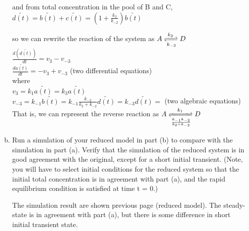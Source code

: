 \documentclass[paper=a4, fontsize=11pt]{scrartcl} %
\numberwithin{equation}{section} %
\numberwithin{figure}{section} %
\numberwithin{table}{section} %
\begin{document}
\begin{enumerate}[a)]
		and from total concentration in the pool of B and C,\\
		$\tilde{d(t)}=\tilde{b(t)}+\tilde{c(t)}=(1+\frac{k_2}{k_{-2}})\tilde{b(t)}$

		so we can rewrite the reaction of the system as $A \xrightleftharpoons[k_{-3}]{k_{3}} D$\\
		$\frac{d(\tilde{d(t)})}{dt}=v_{3}-v_{-3}$\\
		$\frac{d\tilde{a(t)}}{dt}=-v_{3}+v_{-3}$ (two differential equations)\\
		where\\
		$v_{3}=k_1\tilde{a(t)}=k_3\tilde{a(t)}$\\
		$v_{-3}=k_{-1}\tilde{b(t)}=k_{-1}\frac{k_{-2}}{k_2+k_{-2}}\tilde{d(t)}=k_{-3}\tilde{d(t)}=$
		(two algebraic equations)\\
		That is, we can represent the reverse reaction as $A \xrightleftharpoons[\frac{k_{-1}k_{-2}}{k_2+k_{-2}}]{k_{1}} D$

		\item Run a simulation of your reduced model in part (b) to compare with the simulation in part (a). Verify that the simulation of the reduced system is in good agreement with the original, except for a short initial transient. (Note, you will have to select initial conditions for the reduced system so that the initial total concentration is in agreement with part (a), and the rapid equilibrium condition is satisfied at time t = 0.)

		The simulation result are shown previous page (reduced model). The steady-state is in agreement with part (a), but there is some difference in short initial transient state.

	\end{enumerate}
\end{document}
